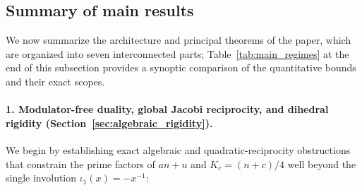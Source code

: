 \documentclass[11pt, a4paper]{article}
\theoremstyle{plain}
\theoremstyle{definition}
\begin{document}
\subsection{Summary of main results}\label{subsec:contributions}

We now summarize the architecture and principal theorems of the paper, which are organized into seven interconnected parts; Table~\ref{tab:main_regimes} at the end of this subsection provides a synoptic comparison of the quantitative bounds and their exact scopes.

\paragraph{1. Modulator-free duality, global Jacobi reciprocity, and dihedral rigidity (Section~\ref{sec:algebraic_rigidity}).}
We begin by establishing exact algebraic and quadratic-reciprocity obstructions that constrain the prime factors of $an+u$ and $K_c=(n+c)/4$ well beyond the single involution $\iota_1(x)=-x^{-1}$:
\end{document}
